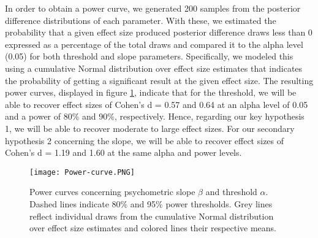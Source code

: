 \documentclass{article}
\begin{document}
In order to obtain a power curve, we generated 200 samples from the posterior difference distributions of each parameter. With these, we estimated the probability that a given effect size produced posterior difference draws less than 0 expressed as a percentage of the total draws and compared it to the alpha level (0.05) for both threshold and slope parameters.
Specifically, we modeled this using a cumulative Normal distribution over effect size estimates that indicates the probability of getting a significant result at the given effect size.
The resulting power curves, displayed in figure \ref{power-curve}, indicate that for the threshold, we will be able to recover effect sizes of Cohen's d = 0.57 and 0.64 at an alpha level of 0.05 and a power of 80\% and 90\%, respectively. Hence, regarding our key hypothesis 1, we will be able to recover moderate to large effect sizes. For our secondary hypothesis 2 concerning the slope, we will be able to recover effect sizes of Cohen's d = 1.19 and 1.60 at the same alpha and power levels.

\begin{figure}
\label{power-curve}
\texttt{[image: Power-curve.PNG]}
\centering
\caption{Power curves concerning psychometric slope $\beta$ and threshold $\alpha$. Dashed lines indicate 80\% and 95\% power thresholds. Grey lines reflect individual draws from the cumulative Normal distribution over effect size estimates and colored lines their respective means.}
\end{figure}
\end{document}
